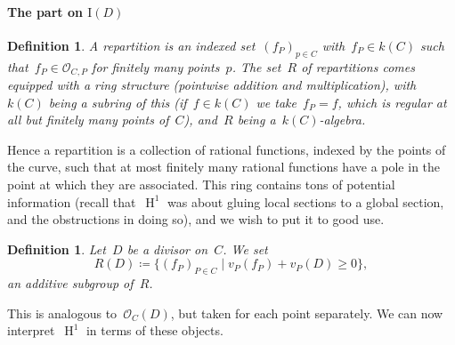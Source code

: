 \documentclass[10pt,a4paper]{article}
\theoremstyle{lecture}
\newtheorem{definition}[theorem]{Definition}
\newcommand\dash{\nobreakdash-\hspace{0pt}}
\DeclareMathOperator\HH{H}
\begin{document}
\paragraph{The part on $\mathrm{I}(D)$}
\begin{definition}
  A \emph{repartition} is an indexed set~$(f_P)_{p\in C}$ with~$f_P\in k(C)$ such that~$f_P\in\mathcal{O}_{C,P}$ for finitely many points~$p$. The set~$R$ of repartitions comes equipped with a ring structure (pointwise addition and multiplication), with~$k(C)$ being a subring of this (if~$f\in k(C)$ we take~$f_P=f$, which is regular at all but finitely many points of~$C$), and~$R$ being a~$k(C)$\dash algebra.
\end{definition}
Hence a repartition is a collection of rational functions, indexed by the points of the curve, such that at most finitely many rational functions have a pole in the point at which they are associated. This ring contains tons of potential information (recall that~$\HH^1$ was about gluing local sections to a global section, and the obstructions in doing so), and we wish to put it to good use.
\begin{definition}
  Let~$D$ be a divisor on~$C$. We set
  \begin{equation}
    R(D)\coloneqq\{(f_P)_{P\in C}\mid v_P(f_P)+v_P(D)\geq 0\},
  \end{equation}
  an additive subgroup of~$R$.
\end{definition}
This is analogous to~$\mathcal{O}_C(D)$, but taken for each point separately. We can now interpret~$\HH^1$ in terms of these objects.
\end{document}

